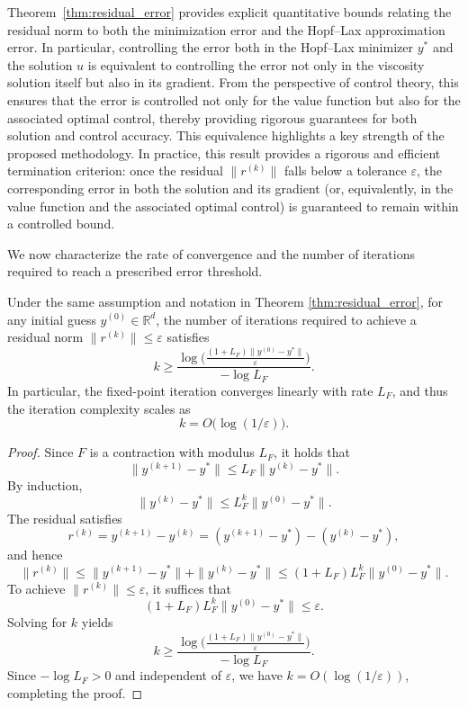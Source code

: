 \documentclass[review,hidelinks,onefignum,onetabnum]{siamart250106}
\begin{document}
Theorem~\ref{thm:residual_error} provides explicit quantitative bounds relating the residual norm to both the minimization error and the Hopf--Lax approximation error.  
In particular, controlling the error both in the Hopf--Lax minimizer $y^*$ and the solution $u$ is equivalent to controlling the error not only in the viscosity solution itself but also in its gradient.
From the perspective of control theory, this ensures that the error is controlled not only for the value function but also for the associated optimal control, thereby providing rigorous guarantees for both solution and control accuracy.
This equivalence highlights a key strength of the proposed methodology.
In practice, this result provides a rigorous and efficient termination criterion: once the residual \(\|r^{(k)}\|\) falls below a tolerance \(\varepsilon\),
the corresponding error in both the solution and its gradient (or, equivalently, in the value function and the associated optimal control) is guaranteed to remain within a controlled bound.

We now characterize the rate of convergence and the number of iterations required to reach a prescribed error threshold.

\begin{theorem}\label{thm:iteration_complexity}
Under the same assumption and notation in Theorem \ref{thm:residual_error},
for any initial guess \(y^{(0)} \in \mathbb{R}^d\),
the number of iterations required to achieve a residual norm
\(\|r^{(k)}\| \le \varepsilon\) satisfies
\[
    k \ge 
    \frac{\log\!\Big(\frac{(1 + L_F)\|y^{(0)} - y^*\|}{\varepsilon}\Big)}{-\log L_F}.
\]
In particular, the fixed-point iteration converges linearly with rate \(L_F\),
and thus the iteration complexity scales as
\[
    k = O\big(\log(1/\varepsilon)\big).
\]
\end{theorem}

\begin{proof}
Since \(F\) is a contraction with modulus \(L_F\), it holds that
\[
    \|y^{(k+1)} - y^*\| \le L_F \|y^{(k)} - y^*\|.
\]
By induction,
\[
    \|y^{(k)} - y^*\| \le L_F^k \|y^{(0)} - y^*\|.
\]
The residual satisfies
\[
    r^{(k)} = y^{(k+1)} - y^{(k)}
    = (y^{(k+1)} - y^*) - (y^{(k)} - y^*),
\]
and hence
\[
    \|r^{(k)}\| 
    \le \|y^{(k+1)} - y^*\| + \|y^{(k)} - y^*\|
    \le (1 + L_F)L_F^k \|y^{(0)} - y^*\|.
\]
To achieve \(\|r^{(k)}\| \le \varepsilon\), it suffices that
\[
    (1 + L_F)L_F^k \|y^{(0)} - y^*\| \le \varepsilon.
\]
Solving for \(k\) yields
\[
    k \ge 
    \frac{\log\!\Big(\frac{(1 + L_F)\|y^{(0)} - y^*\|}{\varepsilon}\Big)}{-\log L_F}.
\]
Since \(-\log L_F > 0\) and independent of \(\varepsilon\),
we have \(k = O(\log(1/\varepsilon))\), completing the proof.
\end{proof}
\end{document}
